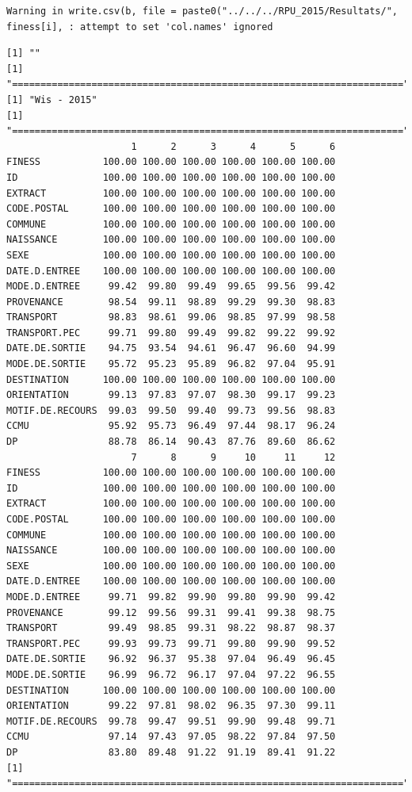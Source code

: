 \documentclass[]{article}
\begin{document}
\begin{verbatim}
Warning in write.csv(b, file = paste0("../../../RPU_2015/Resultats/",
finess[i], : attempt to set 'col.names' ignored
\end{verbatim}

\begin{verbatim}
[1] ""
[1] "====================================================================="
[1] "Wis - 2015"
[1] "====================================================================="
                      1      2      3      4      5      6
FINESS           100.00 100.00 100.00 100.00 100.00 100.00
ID               100.00 100.00 100.00 100.00 100.00 100.00
EXTRACT          100.00 100.00 100.00 100.00 100.00 100.00
CODE.POSTAL      100.00 100.00 100.00 100.00 100.00 100.00
COMMUNE          100.00 100.00 100.00 100.00 100.00 100.00
NAISSANCE        100.00 100.00 100.00 100.00 100.00 100.00
SEXE             100.00 100.00 100.00 100.00 100.00 100.00
DATE.D.ENTREE    100.00 100.00 100.00 100.00 100.00 100.00
MODE.D.ENTREE     99.42  99.80  99.49  99.65  99.56  99.42
PROVENANCE        98.54  99.11  98.89  99.29  99.30  98.83
TRANSPORT         98.83  98.61  99.06  98.85  97.99  98.58
TRANSPORT.PEC     99.71  99.80  99.49  99.82  99.22  99.92
DATE.DE.SORTIE    94.75  93.54  94.61  96.47  96.60  94.99
MODE.DE.SORTIE    95.72  95.23  95.89  96.82  97.04  95.91
DESTINATION      100.00 100.00 100.00 100.00 100.00 100.00
ORIENTATION       99.13  97.83  97.07  98.30  99.17  99.23
MOTIF.DE.RECOURS  99.03  99.50  99.40  99.73  99.56  98.83
CCMU              95.92  95.73  96.49  97.44  98.17  96.24
DP                88.78  86.14  90.43  87.76  89.60  86.62
                      7      8      9     10     11     12
FINESS           100.00 100.00 100.00 100.00 100.00 100.00
ID               100.00 100.00 100.00 100.00 100.00 100.00
EXTRACT          100.00 100.00 100.00 100.00 100.00 100.00
CODE.POSTAL      100.00 100.00 100.00 100.00 100.00 100.00
COMMUNE          100.00 100.00 100.00 100.00 100.00 100.00
NAISSANCE        100.00 100.00 100.00 100.00 100.00 100.00
SEXE             100.00 100.00 100.00 100.00 100.00 100.00
DATE.D.ENTREE    100.00 100.00 100.00 100.00 100.00 100.00
MODE.D.ENTREE     99.71  99.82  99.90  99.80  99.90  99.42
PROVENANCE        99.12  99.56  99.31  99.41  99.38  98.75
TRANSPORT         99.49  98.85  99.31  98.22  98.87  98.37
TRANSPORT.PEC     99.93  99.73  99.71  99.80  99.90  99.52
DATE.DE.SORTIE    96.92  96.37  95.38  97.04  96.49  96.45
MODE.DE.SORTIE    96.99  96.72  96.17  97.04  97.22  96.55
DESTINATION      100.00 100.00 100.00 100.00 100.00 100.00
ORIENTATION       99.22  97.81  98.02  96.35  97.30  99.11
MOTIF.DE.RECOURS  99.78  99.47  99.51  99.90  99.48  99.71
CCMU              97.14  97.43  97.05  98.22  97.84  97.50
DP                83.80  89.48  91.22  91.19  89.41  91.22
[1] "====================================================================="
\end{verbatim}
\end{document}
